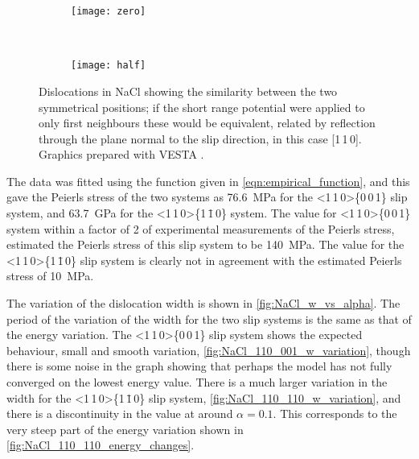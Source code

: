 \begin{figure}
\end{figure}



\begin{figure}
\centering
\begin{subfigure}{55mm}
\centering
\texttt{[image: zero]}
\caption{}
\end{subfigure}
~
\begin{subfigure}{55mm}
\centering
\texttt{[image: half]}
\caption{}
\end{subfigure}


\caption[The symmetrical positions of dislocations in NaCl.]{Dislocations in NaCl showing the similarity between the two symmetrical positions; if the short range potential were applied to only first neighbours these would be equivalent, related by reflection through the plane normal to the slip direction, in this case [1\,1\,0]. Graphics prepared with VESTA \cite{Momma2011}.\label{fig:NaCl_symmetry}}
\end{figure}


The data was fitted using the function given in \autoref{eqn:empirical_function}, and this gave the Peierls stress of the two systems as \SI{76.6}{\mega\pascal} for the <1\,1\,0>\{0\,0\,1\} slip system, and \SI{63.7}{\giga\pascal} for the <1\,1\,0>\{1\,\={1}\,0\} system. The value for <1\,1\,0>\{0\,0\,1\} system within a factor of 2 of experimental measurements of the Peierls stress, \citet{Haasen1985} estimated the Peierls stress of this slip system to be \SI{140}{\mega\pascal}. The value for the <1\,1\,0>\{1\,\={1}\,0\} slip system is clearly not in agreement with the estimated Peierls stress of \SI{10}{\mega\pascal}.



The variation of the dislocation width is shown in \autoref{fig:NaCl_w_vs_alpha}. The period of the variation of the width for the two slip systems is the same as that of the energy variation. The <1\,1\,0>\{0\,0\,1\} slip system shows the expected behaviour, small and smooth variation, \autoref{fig:NaCl_110_001_w_variation}, though there is some noise in the graph showing that perhaps the model has not fully converged on the lowest energy value. There is a much larger variation in the width for the <1\,1\,0>\{1\,\={1}\,0\} slip system, \autoref{fig:NaCl_110_110_w_variation}, and there is a discontinuity in the value at around $\alpha=0.1$. This corresponds to the very steep part of the energy variation shown in \autoref{fig:NaCl_110_110_energy_changes}.


